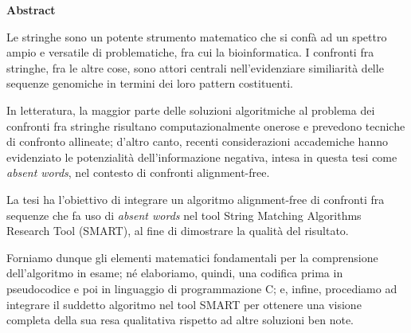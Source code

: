 \clearpage
\setcounter{page}{1}

{\Huge \textbf{Abstract}}

\vspace{15mm}

Le stringhe sono un potente strumento matematico che si confà ad un spettro ampio e versatile di problematiche, fra cui la bioinformatica. I confronti fra stringhe, fra le altre cose, sono attori centrali nell'evidenziare similiarità delle sequenze genomiche in termini dei loro pattern costituenti.

In letteratura, la maggior parte delle soluzioni algoritmiche al problema dei confronti fra stringhe risultano computazionalmente onerose e prevedono tecniche di confronto allineate; d'altro canto, recenti considerazioni accademiche hanno evidenziato le potenzialità dell'informazione negativa, intesa in questa tesi come \textit{absent words}, nel contesto di confronti alignment-free.

La tesi ha l'obiettivo di integrare un algoritmo alignment-free di confronti fra sequenze che fa uso di \textit{absent words} nel tool String Matching Algorithms Research Tool (SMART), al fine di dimostrare la qualità del risultato.

Forniamo dunque gli elementi matematici fondamentali per la comprensione dell'algoritmo in esame; né elaboriamo, quindi, una codifica prima in pseudocodice e poi in linguaggio di programmazione C; e, infine, procediamo ad integrare il suddetto algoritmo nel tool SMART per ottenere una visione completa della sua resa qualitativa rispetto ad altre soluzioni ben note.
